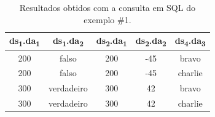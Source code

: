 \begin{table}[!htb]
    \centering
    \begin{tabular}{c|c|c|c|c}
\textbf{ds\textsubscript{1}.da\textsubscript{1}} & \textbf{ds\textsubscript{1}.da\textsubscript{2}} & \textbf{ds\textsubscript{2}.da\textsubscript{1}} & \textbf{ds\textsubscript{2}.da\textsubscript{2}} & \textbf{ds\textsubscript{4}.da\textsubscript{3}} \\ \hline
200              & falso            & 200              & -45              & bravo            \\
200              & falso            & 200              & -45              & charlie          \\
300              & verdadeiro       & 300              & 42               & bravo            \\
300              & verdadeiro       & 300              & 42               & charlie         
    \end{tabular}
    \caption[Resultados obtidos com a consulta em SQL do exemplo \#1]{Resultados obtidos com a consulta em SQL do exemplo \#1.}
    \label{tab:example-query-results-1}
\end{table}